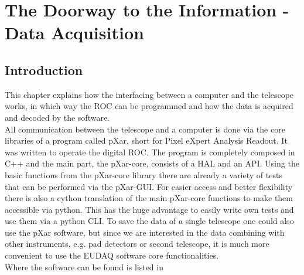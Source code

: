 \documentclass[british,11pt,a4paper]{memoir}
\begin{document}
\chapter{The Doorway to the Information - Data Acquisition}
\section{Introduction}
This chapter explains how the interfacing between a computer and the telescope works, in which way the \ac{ROC} can be programmed and how the data is acquired and decoded by the software.\\
All communication between the telescope and a computer is done via the core libraries of a program called pXar, short for Pixel eXpert Analysis Readout. It was written to operate the digital \ac{ROC}. The program is completely composed in C++ and the main part, the pXar-core, consists of a \ac{HAL} and an \ac{API}. Using the basic functions from the pXar-core library there are already a variety of tests that can be performed via the pXar-\ac{GUI}. For easier access and better flexibility there is also a cython translation of the main pXar-core functions to make them accessible via python. This has the huge advantage to easily write own tests and use them via a python \ac{CLI}. To save the data of a single telescope one could also use the pXar software, but since we are interested in the data combining with other instruments, e.g. pad detectors or second telescope, it is much more convenient to use the EUDAQ software core functionalities.\\
Where the software can be found is listed in 
\end{document}
